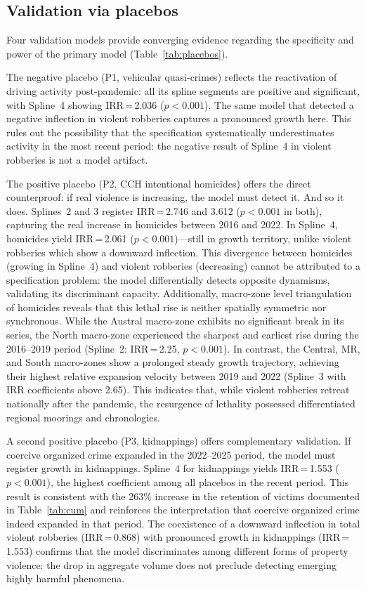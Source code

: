 \documentclass[pdflatex,sn-basic]{sn-jnl}
\begin{document}
\subsection{Validation via placebos}
\label{sub:placebos}

Four validation models provide converging evidence regarding the specificity and
power of the primary model (Table~\ref{tab:placebos}).

The negative placebo (P1, vehicular quasi-crimes) reflects the reactivation of
driving activity post-pandemic: all its spline segments are positive and significant,
with Spline~4 showing IRR\,=\,2.036 ($p<0.001$). The same model that detected a
negative inflection in violent robberies captures a pronounced growth here. This
rules out the possibility that the specification systematically underestimates
activity in the most recent period: the negative result of Spline~4 in violent robberies
is not a model artifact.

The positive placebo (P2, CCH intentional homicides) offers the direct counterproof: if real violence
is increasing, the model must detect it. And so it does.
Splines~2 and 3 register IRR\,=\,2.746 and 3.612 ($p<0.001$ in both), capturing the
real increase in homicides between 2016 and 2022. In Spline~4, homicides
yield IRR\,=\,2.061 ($p<0.001$)---still in growth territory, unlike
violent robberies which show a downward inflection. This divergence between
homicides (growing in Spline~4) and violent robberies (decreasing) cannot be attributed
to a specification problem: the model differentially detects opposite dynamisms,
validating its discriminant capacity. Additionally, macro-zone level triangulation of homicides reveals that this lethal rise is neither spatially symmetric nor synchronous. While the Austral macro-zone exhibits no significant break in its series, the North macro-zone experienced the sharpest and earliest rise during the 2016--2019 period (Spline~2: IRR\,=\,2.25, $p<0.001$). In contrast, the Central, MR, and South macro-zones show a prolonged steady growth trajectory, achieving their highest relative expansion velocity between 2019 and 2022 (Spline~3 with IRR coefficients above 2.65). This indicates that, while violent robberies retreat nationally after the pandemic, the resurgence of lethality possessed differentiated regional moorings and chronologies.

A second positive placebo (P3, kidnappings) offers complementary validation. If
coercive organized crime expanded in the 2022--2025 period, the model must
register growth in kidnappings. Spline~4 for kidnappings yields
IRR\,=\,1.553 ($p<0.001$), the highest coefficient among all placebos in
the recent period. This result is consistent with the 263\% increase in the
retention of victims documented in Table~\ref{tab:cum} and reinforces the
interpretation that coercive organized crime indeed expanded in that
period. The coexistence of a downward inflection in total violent robberies
(IRR\,=\,0.868) with pronounced growth in kidnappings (IRR\,=\,1.553) confirms
that the model discriminates among different forms of property violence: the drop
in aggregate volume does not preclude detecting emerging highly harmful phenomena.
\end{document}
